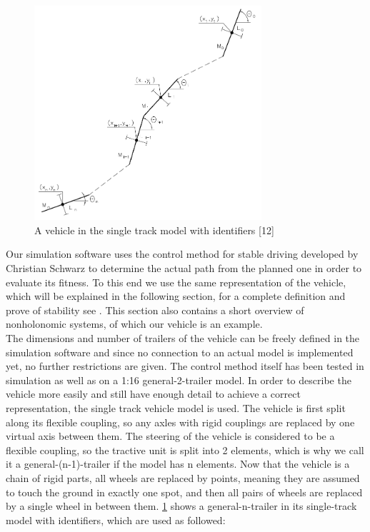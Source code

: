 \begin{figure}[t]
\centering
\includegraphics[width=0.75\textwidth]{./Chapters/Figures/single-track-model.png}
\caption{A vehicle in the single track model with identifiers [12] \label{pic:single-track-model}}
\end{figure}

Our simulation software uses the control method for stable driving developed by Christian Schwarz to determine the actual path from the planned one in order to evaluate its fitness. To this end we use the same representation of the vehicle, which will be explained in the following section, for a complete definition and prove of stability see \cite{12}. This section also contains a short overview of nonholonomic systems, of which our vehicle is an example.\\
The dimensions and number of trailers of the vehicle can be freely defined in the simulation software and since no connection to an actual model is implemented yet, no further restrictions are given. The control method itself has been tested in simulation as well as on a 1:16 general-2-trailer model. In order to describe the vehicle more easily and still have enough detail to achieve a correct representation, the single track vehicle model is used\cite{27}. The vehicle is first split along its flexible coupling, so any axles with rigid couplings are replaced by one virtual axis between them. The steering of the vehicle is considered to be a flexible coupling, so the tractive unit is split into 2 elements, which is why we call it a general-(n-1)-trailer if the model has n elements. Now that the vehicle is a chain of rigid parts, all wheels are replaced by points, meaning they are assumed to touch the ground in exactly one spot, and then all pairs of wheels are replaced by a single wheel in between them. \ref{pic:single-track-model} shows a general-n-trailer in its single-track model with identifiers, which are used as followed:

